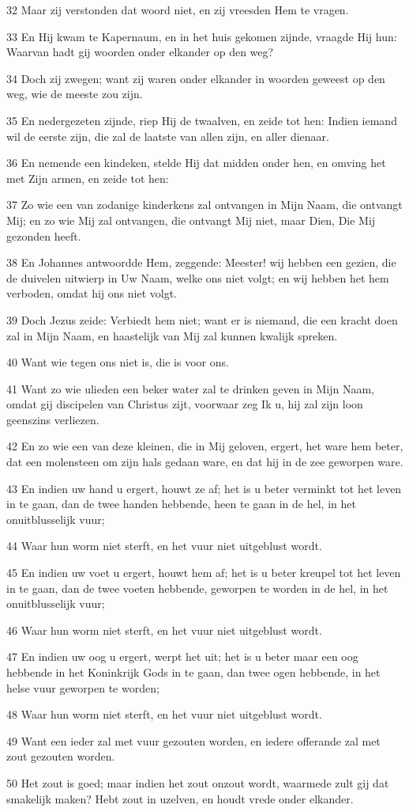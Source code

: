 \par 32 Maar zij verstonden dat woord niet, en zij vreesden Hem te vragen.
\par 33 En Hij kwam te Kapernaum, en in het huis gekomen zijnde, vraagde Hij hun: Waarvan hadt gij woorden onder elkander op den weg?
\par 34 Doch zij zwegen; want zij waren onder elkander in woorden geweest op den weg, wie de meeste zou zijn.
\par 35 En nedergezeten zijnde, riep Hij de twaalven, en zeide tot hen: Indien iemand wil de eerste zijn, die zal de laatste van allen zijn, en aller dienaar.
\par 36 En nemende een kindeken, stelde Hij dat midden onder hen, en omving het met Zijn armen, en zeide tot hen:
\par 37 Zo wie een van zodanige kinderkens zal ontvangen in Mijn Naam, die ontvangt Mij; en zo wie Mij zal ontvangen, die ontvangt Mij niet, maar Dien, Die Mij gezonden heeft.
\par 38 En Johannes antwoordde Hem, zeggende: Meester! wij hebben een gezien, die de duivelen uitwierp in Uw Naam, welke ons niet volgt; en wij hebben het hem verboden, omdat hij ons niet volgt.
\par 39 Doch Jezus zeide: Verbiedt hem niet; want er is niemand, die een kracht doen zal in Mijn Naam, en haastelijk van Mij zal kunnen kwalijk spreken.
\par 40 Want wie tegen ons niet is, die is voor ons.
\par 41 Want zo wie ulieden een beker water zal te drinken geven in Mijn Naam, omdat gij discipelen van Christus zijt, voorwaar zeg Ik u, hij zal zijn loon geenszins verliezen.
\par 42 En zo wie een van deze kleinen, die in Mij geloven, ergert, het ware hem beter, dat een molensteen om zijn hals gedaan ware, en dat hij in de zee geworpen ware.
\par 43 En indien uw hand u ergert, houwt ze af; het is u beter verminkt tot het leven in te gaan, dan de twee handen hebbende, heen te gaan in de hel, in het onuitblusselijk vuur;
\par 44 Waar hun worm niet sterft, en het vuur niet uitgeblust wordt.
\par 45 En indien uw voet u ergert, houwt hem af; het is u beter kreupel tot het leven in te gaan, dan de twee voeten hebbende, geworpen te worden in de hel, in het onuitblusselijk vuur;
\par 46 Waar hun worm niet sterft, en het vuur niet uitgeblust wordt.
\par 47 En indien uw oog u ergert, werpt het uit; het is u beter maar een oog hebbende in het Koninkrijk Gods in te gaan, dan twee ogen hebbende, in het helse vuur geworpen te worden;
\par 48 Waar hun worm niet sterft, en het vuur niet uitgeblust wordt.
\par 49 Want een ieder zal met vuur gezouten worden, en iedere offerande zal met zout gezouten worden.
\par 50 Het zout is goed; maar indien het zout onzout wordt, waarmede zult gij dat smakelijk maken? Hebt zout in uzelven, en houdt vrede onder elkander.

